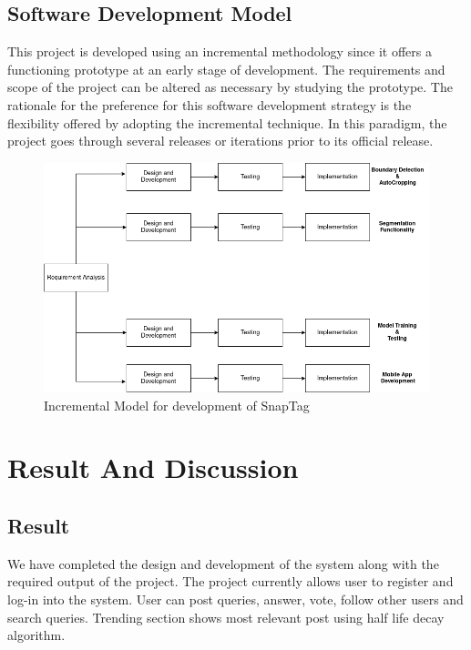 \section{Software Development Model}
This project is developed using an incremental methodology since it offers a functioning prototype at an early stage of development. The requirements and scope of the project can be altered as necessary by studying the prototype. The rationale for the preference for this software development strategy is the flexibility offered by adopting the incremental technique. In this paradigm, the project goes through several releases or iterations prior to its official release.
\begin{figure}[h!]
        \includegraphics[scale=0.45]{images/SDLC.png}
        \caption{Incremental Model for development of SnapTag}%
    \end{figure}
\newpage
\chapter{Result And Discussion}
\section{Result}
We have completed the design and development of the system along with the required output of the project. The project currently allows user to register and log-in into the system. User can post queries, answer, vote, follow other users and search queries.  Trending section shows most relevant post using half life decay algorithm.
